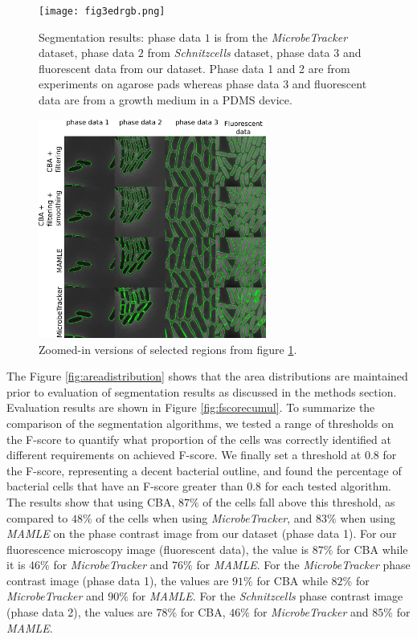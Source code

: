 \documentclass[journal]{IEEEtran}
\begin{document}
\begin{figure}[h]
	\begin{center}
		
		\texttt{[image: fig3edrgb.png]}			
		
		\caption{Segmentation results: phase data $1$ is from the \textit{MicrobeTracker} dataset, phase data $2$ from \textit{Schnitzcells} dataset, phase data $3$ and fluorescent data from our dataset. Phase data 1 and 2 are from experiments on agarose pads whereas phase data 3 and fluorescent data are from a growth medium in a PDMS device.}\label{fig:segcompare}
	\end{center}
\end{figure}


\begin{figure}[h]
	\begin{center}
		
		\includegraphics[width=7.5cm]{fig4ed.png}					
		\caption{Zoomed-in versions of selected regions from figure \ref{fig:segcompare}.}\label{fig:segcomparezoom}
	\end{center}
\end{figure}

The Figure \ref{fig:areadistribution} shows that the area distributions are maintained prior to evaluation of segmentation results as discussed in the methods section. Evaluation results are shown in Figure \ref{fig:fscorecumul}. To summarize the comparison of the segmentation algorithms, we tested a range of thresholds on the F-score to quantify what proportion of the cells was correctly identified at different requirements on achieved F-score. We finally set a threshold at $0.8$ for the F-score, representing a decent bacterial outline, and found the percentage of bacterial cells that have an F-score greater than $0.8$ for each tested algorithm. The results show that using CBA, $87\%$ of the cells fall above this threshold, as compared to $48\%$ of the cells when using  \textit{MicrobeTracker}, and $83\%$ when using \textit{MAMLE} on the phase contrast image from our dataset (phase data 1). For our fluorescence microscopy image (fluorescent data), the value is $87\%$ for CBA while it is $46\%$ for \textit{MicrobeTracker} and $76\%$ for \textit{MAMLE}. For the \textit{MicrobeTracker} phase contrast image (phase data 1), the values are $91\%$ for CBA while $82\%$ for \textit{MicrobeTracker} and $90\%$ for \textit{MAMLE}. For the \textit{Schnitzcells} phase contrast image (phase data 2), the values are $78\%$ for CBA, $46\%$ for \textit{MicrobeTracker} and $85\%$ for \textit{MAMLE}.
\end{document}
